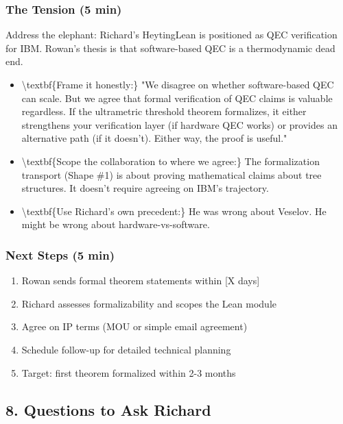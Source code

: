 \documentclass[11pt,a4paper]{article}
\begin{document}
\subsubsection{The Tension (5 min)}


Address the elephant: Richard's HeytingLean is positioned as QEC verification for IBM. Rowan's thesis is that software-based QEC is a thermodynamic dead end.

\begin{itemize}
\item \textbackslash{}textbf\{Frame it honestly:\} "We disagree on whether software-based QEC can scale. But we agree that formal verification of QEC claims is valuable regardless. If the ultrametric threshold theorem formalizes, it either strengthens your verification layer (if hardware QEC works) or provides an alternative path (if it doesn't). Either way, the proof is useful."
\item \textbackslash{}textbf\{Scope the collaboration to where we agree:\} The formalization transport (Shape \#1) is about proving mathematical claims about tree structures. It doesn't require agreeing on IBM's trajectory.
\item \textbackslash{}textbf\{Use Richard's own precedent:\} He was wrong about Veselov. He might be wrong about hardware-vs-software.
\end{itemize}


\subsubsection{Next Steps (5 min)}


\begin{enumerate}
\item Rowan sends formal theorem statements within [X days]
\item Richard assesses formalizability and scopes the Lean module
\item Agree on IP terms (MOU or simple email agreement)
\item Schedule follow-up for detailed technical planning
\item Target: first theorem formalized within 2-3 months
\end{enumerate}


\hrulefill


\subsection{8. Questions to Ask Richard}
\end{document}

